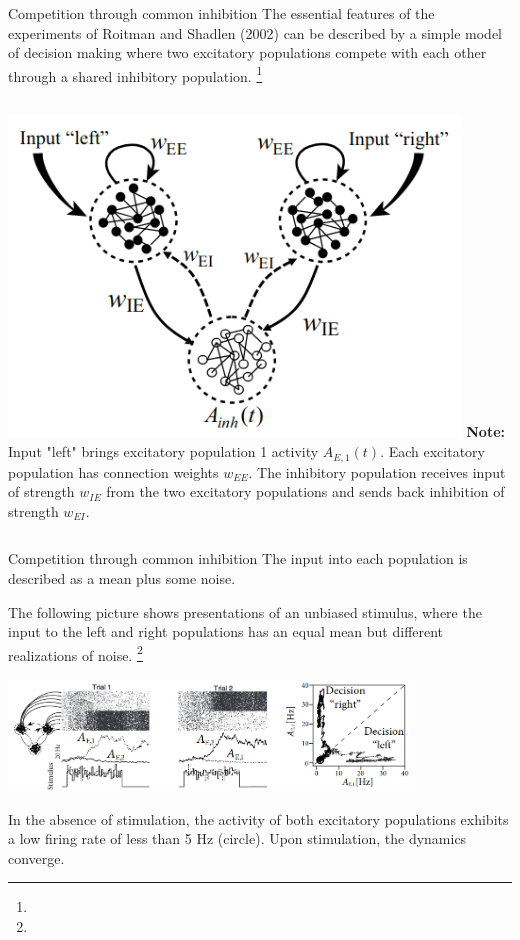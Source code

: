 \documentclass[xcolor=table,dvipsnames,svgnames,aspectratio=169,fontset=fandol]{ctexbeamer}
\begin{document}
\begin{frame}{Competition through common inhibition}
  The essential features of the experiments of Roitman and Shadlen (2002) can be described by a simple model of decision making where two excitatory populations compete with each other through a shared inhibitory population. \footnote{}  
  \begin{columns}
    \includegraphics[width=0.9\textwidth,height=0.6\textheight]{competition.png}
    \textbf{Note:} Input "left" brings excitatory population 1 activity $A_{E,1}(t)$. Each excitatory population has connection weights $w_{EE}$. The inhibitory population receives input of strength $w_{IE}$ from the two excitatory populations and sends back inhibition of strength $w_{EI}$.
  \end{columns}
\end{frame}


\begin{frame}{Competition through common inhibition}
  The input into each population is described as a mean plus some noise.

  The following picture shows presentations of an unbiased stimulus, where the input to the left and right populations has an equal mean but different realizations of noise. \footnote{}   
  \begin{center}
  \includegraphics[width=0.8\textwidth,height=0.4\textheight]{competition2.png}
  \end{center}

  \vskip -8pt
  In the absence of stimulation, the activity of both excitatory populations exhibits a low firing rate of less than 5 Hz (circle). Upon stimulation, the dynamics converge.

\end{frame}
\end{document}
